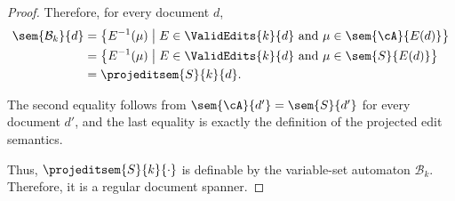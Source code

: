 \begin{proof}
	Therefore, for every document $d$,
\[
\begin{aligned}
	\sem{\mathcal{B}_k}{d}
	&=
	\left\{
	E^{-1}(\mu)
	\;\middle|\;
	E\in\ValidEdits{k}{d}
	\text{ and }
	\mu\in\sem{\cA}{E(d)}
	\right\} \\
	&=
	\left\{
	E^{-1}(\mu)
	\;\middle|\;
	E\in\ValidEdits{k}{d}
	\text{ and }
	\mu\in\sem{S}{E(d)}
	\right\} \\
	&=
	\projeditsem{S}{k}{d}.
\end{aligned}
\]

	The second equality follows from $\sem{\cA}{d'}=\sem{S}{d'}$ for every document $d'$, and the last equality is exactly the definition of the projected edit semantics.
	
	Thus, $\projeditsem{S}{k}{\cdot}$ is definable by the variable-set automaton $\mathcal{B}_k$. Therefore, it is a regular document spanner.
	
\end{proof}
